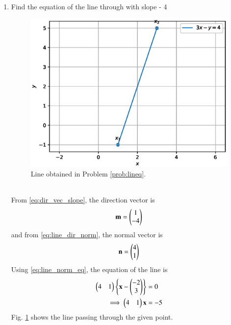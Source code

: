 \begin{enumerate}[label=\thesection.\arabic*.,ref=\thesection.\theenumi]
\item  Find the equation of the line through  with slope - 4 
\label{prob:lineq}
%
\begin{figure}
\centering
\includegraphics[width=\columnwidth]{./figs/line/line_points.eps}
\caption{ Line obtained in Problem \ref{prob:lineq}.}%
\label{fig:line_equation}
\end{figure}
\\
\solution From \eqref{eq:dir_vec_slope}, the direction vector is
\begin{align}
\label{eq:lineq_dir}
\mathbf{m} = \begin{pmatrix}1\\-4\end{pmatrix}
\end{align}
and from \eqref{eq:line_dir_norm}, the normal vector is
\begin{align}
\label{eq:lineq_norm}
\mathbf{n} = \begin{pmatrix}4\\1\end{pmatrix}
\end{align}
Using \eqref{eq:line_norm_eq}, the equation of the line is 
\begin{align}
\label{eq:lineq_norm_arith}
\begin{pmatrix}4 &1\end{pmatrix}\left\{\mathbf{x}-\begin{pmatrix}- 2\\ 3\end{pmatrix}\right\} &= 0
\\
\implies \begin{pmatrix}4 &1\end{pmatrix}\mathbf{x} &= -5
\label{eq:lineq_norm_final}
\end{align}
Fig. \ref{fig:line_equation} shows the line passing through the given point.


\end{enumerate}
